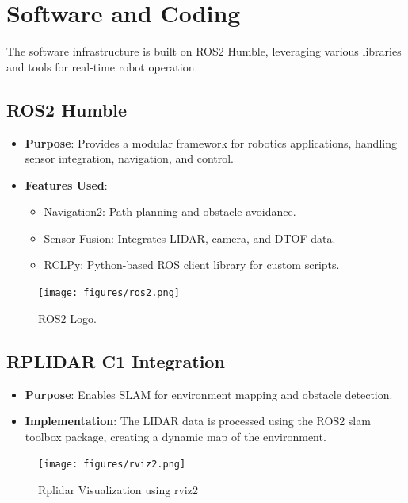 \documentclass[12pt,a4paper]{article}
\begin{document}
\newpage

\section{Software and Coding}
The software infrastructure is built on ROS2 Humble, leveraging various libraries and tools for real-time robot operation.

\subsection{ROS2 Humble}
\begin{itemize}
    \item \textbf{Purpose}: Provides a modular framework for robotics applications, handling sensor integration, navigation, and control.
    \item \textbf{Features Used}:
    \begin{itemize}
        \item Navigation2: Path planning and obstacle avoidance.
        \item Sensor Fusion: Integrates LIDAR, camera, and DTOF data.
        \item RCLPy: Python-based ROS client library for custom scripts.
    \end{itemize}
\end{itemize}

\begin{figure}[ht]
    \centering
    \texttt{[image: figures/ros2.png]}
    \caption{ROS2 Logo.}
    \label{fig:ros2}
\end{figure}

\subsection{RPLIDAR C1 Integration}
\begin{itemize}
    \item \textbf{Purpose}: Enables SLAM for environment mapping and obstacle detection.
    \item \textbf{Implementation}: The LIDAR data is processed using the ROS2 slam toolbox package, creating a dynamic map of the environment.
\end{itemize}

\begin{figure}[H]
    \centering
    \texttt{[image: figures/rviz2.png]}
    \caption{Rplidar Visualization using rviz2}
    \label{fig:rviz2}
\end{figure}
\end{document}
